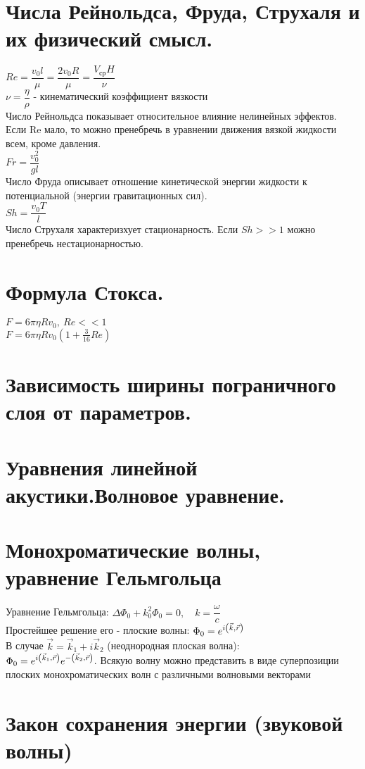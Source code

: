 \begin{multicols*}{3}
		\section{Числа Рейнольдса, Фруда, Струхаля и их физический смысл.}
		$Re=\dfrac{v_0l}{\mu}=\dfrac{2v_0R}{\mu} = \dfrac{V_\text{ср}H}{\nu}$\\
		$\nu=\dfrac{\eta}{\rho}$ - кинематический коэффициент вязкости \\
		Число Рейнольдса показывает относительное влияние нелинейных эффектов. Если Re мало, то можно пренебречь в уравнении движения вязкой жидкости всем, кроме давления. \\
		$Fr=\dfrac{v_0^2}{gl}$ \\
		Число Фруда описывает отношение кинетической энергии жидкости к потенциальной (энергии гравитационных сил). \\
		$Sh=\dfrac{v_0T}{l}$ \\
		Число Струхаля характеризхует стационарность. Если $Sh >> 1$ можно пренебречь нестационарностью.
		
		\section{Формула Стокса.}
		$F=6\pi\eta Rv_0,~Re << 1$ \\
		$F=6\pi\eta Rv_0\left(1+\frac{3}{16}Re\right)$
		
		\section{Зависимость ширины пограничного слоя от параметров.}
		\section{Уравнения линейной акустики.Волновое уравнение.}
		\section{Монохроматические волны, уравнение Гельмгольца}
		Уравнение Гельмгольца:
		$\Delta \Phi_0+k_0^2 \Phi_0 = 0,\quad k=\dfrac{\omega}{c}$\\
		Простейшее решение его - плоские волны:
    	$\Phi_0 = e^{i\qty(\vec{k}, \vec{r})}$\\
		В случае $\vec{k} = \vec{k}_1 + i\vec{k}_2$ (неоднородная плоская волна):\\
		$\Phi_0 = e^{i\qty(\vec{k}_1, \vec{r})}e^{-\qty(\vec{k}_2,\vec{r})}$.
		Всякую волну можно представить в виде суперпозиции плоских монохроматических волн с различными волновыми векторами
		\section{Закон сохранения энергии (звуковой волны)}
	\end{multicols*}
